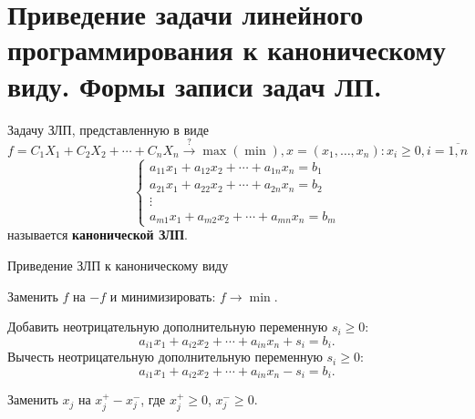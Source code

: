 \documentclass[17pt]{extarticle}
\begin{document}
\section{Приведение задачи линейного программирования к каноническому виду. Формы записи задач ЛП.}
\begin{definition}
    Задачу ЗЛП, представленную в виде
    \(
    f = C_1 X_1 + C_2 X_2 + \cdots + C_n X_n \xrightarrow{?} \max(\min), x = (x_1, \ldots, x_n) \colon x_i \geq 0, i=\overline{1,n} \)
    \[
        \begin{cases}
            a_{11}x_1 + a_{12}x_2 + \cdots + a_{1n}x_n = b_1 \\
            a_{21}x_1 + a_{22}x_2 + \cdots + a_{2n}x_n = b_2 \\
            \vdots                                           \\
            a_{m1}x_1 + a_{m2}x_2 + \cdots + a_{mn}x_n = b_m
        \end{cases}
    \]
    называется \textbf{канонической ЗЛП}.
\end{definition}

\begin{algorithm}
    \caption{Приведение ЗЛП к каноническому виду}
    \begin{algorithmic}[1]
        \State Заменить \( f \) на \( -f \) и минимизировать: \( f \to \min \).
        \EndIf

        \State Добавить неотрицательную дополнительную переменную \( s_i \geq 0 \):
        \[
            a_{i1}x_1 + a_{i2}x_2 + \cdots + a_{in}x_n + s_i = b_i.
        \]
        \State Вычесть неотрицательную дополнительную переменную \( s_i \geq 0 \):
        \[
            a_{i1}x_1 + a_{i2}x_2 + \cdots + a_{in}x_n - s_i = b_i.
        \]
        \EndIf
        \EndFor

        \State Заменить \( x_j \) на \( x_j^+ - x_j^- \), где \( x_j^+ \geq 0 \), \( x_j^- \geq 0 \).
        \EndIf
        \EndFor
    \end{algorithmic}
\end{algorithm}
\end{document}
